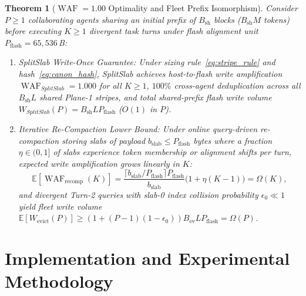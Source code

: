 \documentclass[10pt,journal,compsoc]{IEEEtran}
\newtheorem{theorem}{Theorem}
\theoremstyle{definition}
\theoremstyle{remark}
\newcommand{\SplitSlab}{\textup{\textsc{SplitSlab}}}
\newcommand{\WAF}{\operatorname{WAF}}
\newcommand{\E}{\mathbb{E}}
\def\SplitSlab{SplitSlab}%
\begin{document}
\begin{theorem}[$\WAF = 1.00$ Optimality and Fleet Prefix Isomorphism]\label{thm:waf}
Consider $P \ge 1$ collaborating agents sharing an initial prefix of $B_{\mathrm{sh}}$ blocks ($B_{\mathrm{sh}} M$ tokens) before executing $K \ge 1$ divergent task turns under flash alignment unit $P_{\mathrm{flash}} = 65{,}536$\,B:
\begin{enumerate}
  \item \emph{\SplitSlab{} Write-Once Guarantee:} Under sizing rule~\eqref{eq:stripe_rule} and hash~\eqref{eq:canon_hash}, \SplitSlab{} achieves host-to-flash write amplification $\WAF_{\SplitSlab} = 1.000$ for all $K \ge 1$, $100\%$ cross-agent deduplication across all $B_{\mathrm{sh}} L$ shared Plane-1 stripes, and total shared-prefix flash write volume $W_{\SplitSlab}(P) = B_{\mathrm{sh}} L P_{\mathrm{flash}}$ ($O(1)$ in $P$).
  \item \emph{Iterative Re-Compaction Lower Bound:} Under online query-driven re-compaction storing slabs of payload $b_{\mathrm{slab}} \le P_{\mathrm{flash}}$ bytes where a fraction $\eta \in (0,1]$ of slabs experience token membership or alignment shifts per turn, expected write amplification grows linearly in $K$:
  \begin{equation}\label{eq:thm2_waf}
  \E[\WAF_{\mathrm{recomp}}(K)] = \frac{\lceil b_{\mathrm{slab}} / P_{\mathrm{flash}} \rceil P_{\mathrm{flash}}}{b_{\mathrm{slab}}}\big(1 {+} \eta(K {-} 1)\big) = \Omega(K),
  \end{equation}
  and divergent Turn-2 queries with slab-0 index collision probability $\epsilon_0 \ll 1$ yield fleet write volume $\E[W_{\mathrm{evict}}(P)] \ge (1 + (P-1)(1-\epsilon_0)) B_{\mathrm{ev}} L P_{\mathrm{flash}} = \Omega(P)$.
\end{enumerate}
\end{theorem}

\section{Implementation and Experimental Methodology}\label{sec:methodology}
\end{document}
